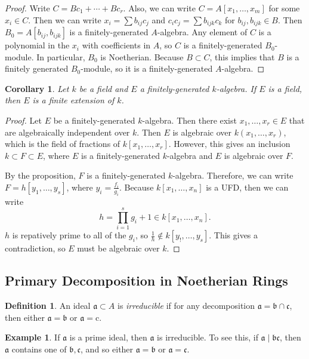 \documentclass[leqno, openany]{memoir}
\newtheorem{cor}[thm]{Corollary}
\theoremstyle{definition}
\newtheorem{defn}[thm]{Definition}
\newtheorem{exm}[thm]{Example}
\theoremstyle{remark}
\theoremstyle{plain}
\theoremstyle{definition}
\theoremstyle{remark}
\newcommand{\mf}[1]{\mathfrak{#1}}
\newcommand{\mr}[1]{\mathrm{#1}}
\begin{document}
\begin{proof}
    Write $C = B c_1 + \cdots + B c_r$. Also, we can write $C = A[x_1, \ldots, x_m]$ for some $x_i \in C$. Then we can write $x_i = \sum b_{ij} c_j$ and $c_ic_j = \sum b_{ijk} c_k$ for $b_{ij}, b_{ijk} \in B$. Then $B_0 = A[b_{ij}, b_{ijk}]$ is a finitely-generated $A$-algebra. Any element of $C$ is a polynomial in the $x_i$ with coefficients in $A$, so $C$ is a finitely-generated $B_0$-module. In particular, $B_0$ is Noetherian. Because $B \subset C$, this implies that $B$ is a finitely generated $B_0$-module, so it is a finitely-generated $A$-algebra.
\end{proof}

\begin{cor}
    Let $k$ be a field and $E$ a finitely-generated $k$-algebra. If $E$ is a field, then $E$ is a finite extension of $k$.
\end{cor}

\begin{proof}
    Let $E$ be a finitely-generated $k$-algebra. Then there exist $x_1, \ldots, x_r \in E$ that are algebraically independent over $k$. Then $E$ is algebraic over $k(x_1, \ldots, x_r)$, which is the field of fractions of $k[x_1, \ldots, x_r]$. However, this gives an inclusion $k \subset F \subset E$, where $E$ is a finitely-generated $k$-algebra and $E$ is algebraic over $F$.

    By the proposition, $F$ is a finitely-generated $k$-algebra. Therefore, we can write $F = h[y_1, \ldots, y_s]$, where $y_i = \frac{f_i}{g_i}$. Because $k[x_1, \ldots, x_n]$ is a UFD, then we can write
    \[ h = \prod_{i=1}^s g_i + 1 \in k[x_1, \ldots, x_n]. \]
    $h$ is repatively prime to all of the $g_i$, so $\frac{1}{h} \notin k[y_!, \ldots, y_s]$. This gives a contradiction, so $E$ must be algebraic over $k$.
\end{proof}

\subsection{Primary Decomposition in Noetherian Rings}%
\label{sub:existence_of_}

\begin{defn}
    An ideal $\mf{a} \subset A$ is \textit{irreducible} if for any decomposition $\mf{a} = \mf{b} \cap \mf{c}$, then either $\mf{a} = \mf{b}$ or $\mf{a} = \mr{c}$.
\end{defn}

\begin{exm}
    If $\mf{a}$ is a prime ideal, then $\mf{a}$ is irreducible. To see this, if $\mf{a} \mid \mf{bc}$, then $\mf{a}$ contains one of $\mf{b}, \mf{c}$, and so either $\mf{a} = \mf{b}$ or $\mf{a} = \mf{c}$.
\end{exm}
\end{document}
